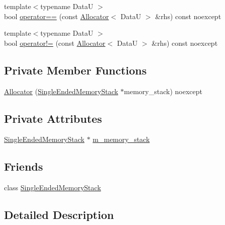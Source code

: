 \begin{DoxyCompactItemize}
\item 
{\footnotesize template$<$typename DataU $>$ }\\bool \hyperlink{structmage_1_1_single_ended_memory_stack_1_1_allocator_a47f5e7baf66ddebc8aec402c6a9f1eef}{operator==} (const \hyperlink{structmage_1_1_single_ended_memory_stack_1_1_allocator}{Allocator}$<$ DataU $>$ \&rhs) const noexcept
\item 
{\footnotesize template$<$typename DataU $>$ }\\bool \hyperlink{structmage_1_1_single_ended_memory_stack_1_1_allocator_ae8b77280f1f31e30cb1536f8ecae08c9}{operator!=} (const \hyperlink{structmage_1_1_single_ended_memory_stack_1_1_allocator}{Allocator}$<$ DataU $>$ \&rhs) const noexcept
\end{DoxyCompactItemize}
\subsection*{Private Member Functions}
\begin{DoxyCompactItemize}
\item 
\hyperlink{structmage_1_1_single_ended_memory_stack_1_1_allocator_a991173b1fccf74994dc9298b3cffb795}{Allocator} (\hyperlink{classmage_1_1_single_ended_memory_stack}{Single\+Ended\+Memory\+Stack} $\ast$memory\+\_\+stack) noexcept
\end{DoxyCompactItemize}
\subsection*{Private Attributes}
\begin{DoxyCompactItemize}
\item 
\hyperlink{classmage_1_1_single_ended_memory_stack}{Single\+Ended\+Memory\+Stack} $\ast$ \hyperlink{structmage_1_1_single_ended_memory_stack_1_1_allocator_ac5d79f87385234430d25cdf004255d70}{m\+\_\+memory\+\_\+stack}
\end{DoxyCompactItemize}
\subsection*{Friends}
\begin{DoxyCompactItemize}
\item 
class \hyperlink{structmage_1_1_single_ended_memory_stack_1_1_allocator_a3f3449e5c2caa1666a293b36db6f5a54}{Single\+Ended\+Memory\+Stack}
\end{DoxyCompactItemize}


\subsection{Detailed Description}
